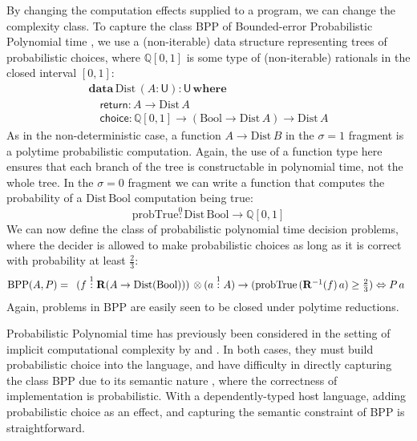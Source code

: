\documentclass[acmsmall,screen]{acmart}
\newcommand{\BoolTy}{\mathrm{Bool}}
\begin{document}
By changing the computation effects supplied to a program, we can
change the complexity class. To capture the class BPP of Bounded-error
Probabilistic Polynomial time \cite{AroraBarak09}, we use a
(non-iterable) data structure representing trees of probabilistic
choices, where $\mathbb{Q}[0,1]$ is some type of (non-iterable)
rationals in the closed interval $[0,1]$:
\begin{displaymath}
  \begin{array}{l}
    \textbf{data}\,\mathrm{Dist}\,(A : \mathsf{U}) : \mathsf{U}\,\textbf{where} \\
    \quad \mathsf{return} : A \to \mathrm{Dist}\,A \\
    \quad \mathsf{choice} : \mathbb{Q}[0,1] \to (\BoolTy \to \mathrm{Dist}\,A) \to \mathrm{Dist}\,A
  \end{array}
\end{displaymath}
As in the non-deterministic case, a function $A \to \mathrm{Dist}\,B$
in the $\sigma = 1$ fragment is a polytime probabilistic
computation. Again, the use of a function type here ensures that each
branch of the tree is constructable in polynomial time, not the whole
tree. In the $\sigma = 0$ fragment we can write a function that
computes the probability of a $\mathrm{Dist}\,\BoolTy$ computation
being true:
\begin{displaymath}
  \mathrm{probTrue} \stackrel0: \mathrm{Dist}\,\BoolTy \to \mathbb{Q}[0,1]
\end{displaymath}
We can now define the class of probabilistic polynomial time decision
problems, where the decider is allowed to make probabilistic choices
as long as it is correct with probability at least $\frac{2}{3}$:
\begin{displaymath}
  \mathrm{BPP}(A,P) =
  \begin{array}[t]{l}
    (f \stackrel1: \mathbf{R}(A \to \mathrm{Dist}(\BoolTy))) \, \otimes
    (a \stackrel1: A) \to (\mathrm{probTrue}\,(\mathbf{R}^{-1}(f)\,a) \geq \frac{2}{3}) \Leftrightarrow P\,a
  \end{array}
\end{displaymath}
Again, problems in BPP are easily seen to be closed under polytime
reductions.

Probabilistic Polynomial time has previously been considered in the
setting of implicit computational complexity by
\citet{dallago_et_al:LIPIcs.MFCS.2021.35} and \citet{LagoT15}. In both
cases, they must build probabilistic choice into the language, and
have difficulty in directly capturing the class BPP due to its
semantic nature \cite{AroraBarak09}, where the correctness of
implementation is probabilistic. With a dependently-typed host
language, adding probabilistic choice as an effect, and capturing the
semantic constraint of BPP is straightforward.
\end{document}
